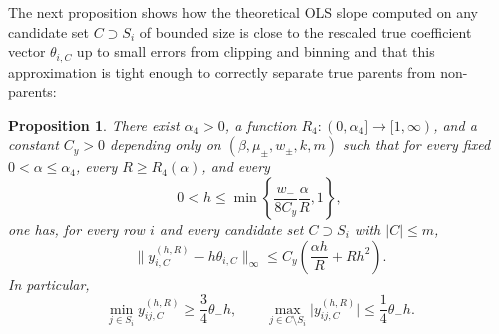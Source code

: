 \documentclass{article}
\newtheorem{proposition}{Proposition}[section]
\newcommand{\norm}[1]{\lVert #1\rVert}
\newcommand{\abs}[1]{\lvert #1\rvert}
\begin{document}
The next proposition shows how the theoretical OLS slope computed on any candidate set $C \supset S_i$ of bounded size is close to the rescaled true coefficient vector $\theta_{i,C}$ up to small errors from clipping and binning and that this approximation is tight enough to correctly separate true parents from non-parents:
\begin{proposition}
\label{prop:population-beta}
There exist $\alpha_4>0$, a function $R_4:(0,\alpha_4]\to[1,\infty)$, and a constant $C_y>0$ depending only on $(\beta,\mu_{\pm},w_{\pm},k,m)$ such that for every fixed $0<\alpha\le \alpha_4$, every $R\ge R_4(\alpha)$, and every
\[
0<h\le \min\left\{\frac{w_-}{8C_y}\frac{\alpha}{R}, 1\right\},
\]
one has, for every row $i$ and every candidate set $C\supset S_i$ with $|C|\le m$,
\begin{equation}
\label{eq:population-beta-bound}
\norm{y_{i,C}^{(h,R)} - h\theta_{i,C}}_\infty \le C_y\left(\frac{\alpha h}{R} + R h^2\right).
\end{equation}
In particular,
\begin{equation}
\label{eq:population-beta-threshold}
\min_{j\in S_i} y_{ij,C}^{(h,R)} \ge \frac{3}{4}\theta_- h,
\qquad
\max_{j\in C\setminus S_i} \abs{y_{ij,C}^{(h,R)}} \le \frac14 \theta_- h.
\end{equation}
\end{proposition}
\end{document}
